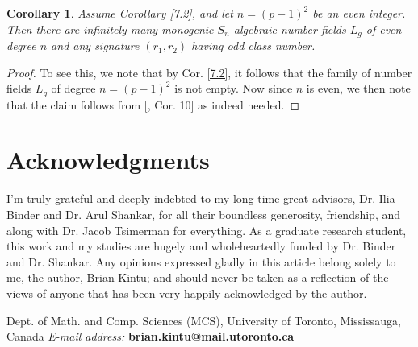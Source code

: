 \documentclass{article}
\theoremstyle{plain}
\newtheorem{cor}[thm]{Corollary}
\theoremstyle{definition}
\begin{document}
\begin{cor}
Assume Corollary \ref{7.2}, and let $n=(p-1)^2$ be an even integer. Then there are infinitely many monogenic $S_{n}$-algebraic number fields $L_{g}$ of even degree $n$ and any signature $(r_{1}, r_{2})$ having odd class number. 
\end{cor}
\begin{proof}
To see this, we note that by Cor. \ref{7.2}, it follows that the family of number fields $L_{g}$ of degree $n = (p-1)^2$ is not empty. Now since $n$ is even, we then note that the claim follows from [\cite{Sia}, Cor. 10] as indeed needed.
\end{proof}

\section*{\textbf{Acknowledgments}}
I'm truly grateful and deeply indebted to my long-time great advisors, Dr. Ilia Binder and Dr. Arul Shankar, for all their boundless generosity, friendship, and along with Dr. Jacob Tsimerman for everything. As a graduate research student, this work and my studies are hugely and wholeheartedly funded by Dr. Binder and Dr. Shankar. Any opinions expressed gladly in this article belong solely to me, the author, Brian Kintu; and should never be taken as a reflection of the views of anyone that has been very happily acknowledged by the author.




\noindent Dept. of Math. and Comp. Sciences (MCS), University of Toronto, Mississauga, Canada \newline
\textit{E-mail address:} \textbf{brian.kintu@mail.utoronto.ca}\newline 
\date{\small{\textit{June 30, 2025}}}
\end{document}
